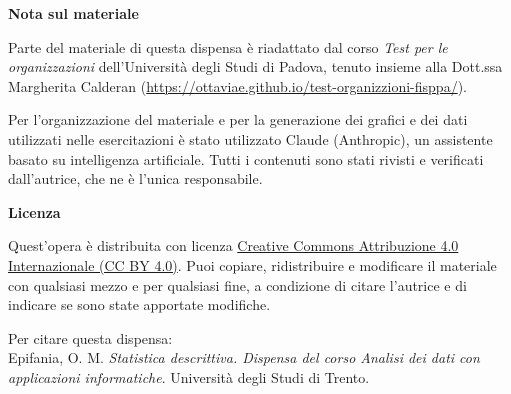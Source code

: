 {  %
  \thispagestyle{empty}
  \null\vfill
  \begin{small}
  \noindent\textbf{Nota sul materiale}\par
  \vspace{2mm}
  \noindent Parte del materiale di questa dispensa è riadattato dal corso
  \emph{Test per le organizzazioni} dell'Università degli Studi di Padova,
  tenuto insieme alla Dott.ssa Margherita Calderan
  (\url{https://ottaviae.github.io/test-organizzioni-fisppa/}).

  \vspace{3mm}
  \noindent Per l'organizzazione del materiale e per la generazione dei grafici
  e dei dati utilizzati nelle esercitazioni è stato utilizzato Claude (Anthropic),
  un assistente basato su intelligenza artificiale. Tutti i contenuti sono stati
  rivisti e verificati dall'autrice, che ne è l'unica responsabile.

  \vspace{8mm}
  \noindent\textbf{Licenza}\par
  \vspace{2mm}
  \noindent Quest'opera è distribuita con licenza
  \href{https://creativecommons.org/licenses/by/4.0/deed.it}{Creative Commons
  Attribuzione 4.0 Internazionale (CC BY 4.0)}.
  Puoi copiare, ridistribuire e modificare il materiale con qualsiasi mezzo
  e per qualsiasi fine, a condizione di citare l'autrice e di indicare se
  sono state apportate modifiche.

  \vspace{3mm}
  \noindent Per citare questa dispensa:\\
  Epifania, O. M. \emph{Statistica descrittiva. Dispensa del corso Analisi dei
  dati con applicazioni informatiche}. Università degli Studi
  di Trento.
  \end{small}
  \clearpage
}
